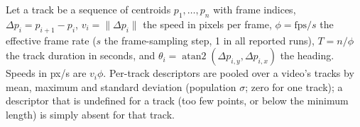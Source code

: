 \providecommand{\f}[1]{\texttt{\detokenize{#1}}}

Let a track be a sequence of centroids $p_1,\dots,p_n$ with frame indices, $\Delta p_i=p_{i+1}-p_i$,
$v_i=\lVert\Delta p_i\rVert$ the speed in pixels per frame, $\phi=\mathrm{fps}/s$ the effective frame rate
($s$ the frame-sampling step, 1 in all reported runs), $T=n/\phi$ the track duration in seconds, and
$\theta_i=\operatorname{atan2}(\Delta p_{i,y},\Delta p_{i,x})$ the heading. Speeds in px/s are $v_i\phi$.
Per-track descriptors are pooled over a video's tracks by mean, maximum and standard deviation (population
$\sigma$; zero for one track); a descriptor that is undefined for a track (too few points, or below the minimum
length) is simply absent for that track.

